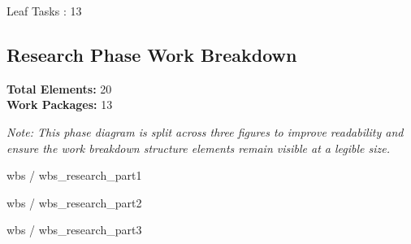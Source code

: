     Leaf Tasks : 13

\subsection {
  Research Phase Work Breakdown
}

\noindent\textbf { Total Elements: }
20
\\\textbf { Work Packages: }
13

\vspace {
  0.5em
}

\noindent\textit {
Note:
  This phase diagram is split across three figures to
      improve readability and ensure the work breakdown structure elements
          remain visible at a legible size.
}

 { wbs / wbs_research_part1 }

\newpage
 { wbs / wbs_research_part2 }

\newpage
 { wbs / wbs_research_part3 }

